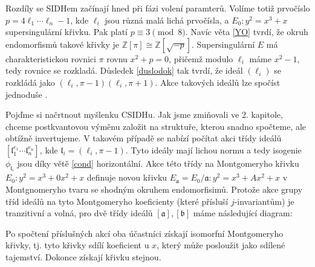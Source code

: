 \documentclass[12pt]{report}
\begin{document}
Rozdíly se SIDHem začínají hned při fázi volení paramterů. Volíme totiž prvočíslo $p = 4 \ell_1 \cdots \ell_n - 1$, kde $\ell_i$ jsou různá malá lichá prvočísla, a $E_0 : y^2 = x^3 + x$ supersingulární křivku. Pak platí $p \equiv 3 \pmod{8}$. Navíc věta \ref{YO} tvrdí, že okruh endomorfismů takové křivky je $\mathbb{Z}[\pi] \cong \mathbb{Z}[\sqrt{-p}]$. Supersingulární $E$ má charakteristickou rovnici $\pi$ rovnu $x^2 + p = 0$, přičemž modulo $\ell_i$ máme $x^2 - 1$, tedy rovnice se rozkladá. Důsledek \ref{duslodok} tak tvrdí, že ideál $(\ell_i)$ se rozkládá jako $(\ell_i,\pi - 1)(\ell_i, \pi + 1)$. Akce takových ideálů lze spočíst jednoduše \cite{CSIDH}.

Pojďme si načrtnout myšlenku CSIDHu. Jak jsme zmiňovali ve 2. kapitole, chceme postkvantovou výměnu založit na struktuře, kterou snadno spočteme, ale obtížně invertujeme. V takovém případě se nabízí počítat akci třídy ideálů $[\mathfrak{l}_1 ^{e_1} \cdots \mathfrak{l}_n ^{e_n}]$, kde $\mathfrak{l}_i = (\ell_i,\pi - 1)$. Tyto ideály mají lichou normu a tedy isogenie $\phi_{\mathfrak{l}_i}$ jsou díky větě \ref{cond} horizontální. Akce této třídy na Montgomeryho křivku $E_0 : y^2 = x^3 + 0x^2 + x$ definuje novou křivku $E_{\mathfrak{a}} =E_0 /\mathfrak{a} : y^2 = x^3 + Ax^2 + x$ v Montgnomeryho tvaru se shodným okruhem endomorfisimů. Protože akce grupy tříd ideálů na tyto Montgomeryho koeficienty (které přísluší $j$-invariantům) je tranzitivní a volná, pro dvě třídy ideálů $[\mathfrak{a}], [\mathfrak{b}]$ máme následující diagram: 

\begin{figure}[h]
\begin{center} 
\end{center}
\end{figure}

Po spočtení příslušných akcí oba účastníci získají isomorfní Montgomeryho křivky, tj. tyto křivky sdílí koeficient u $x$, který může posloužit jako sdílené tajemství. Dokonce získají křivku stejnou. 
\end{document}
